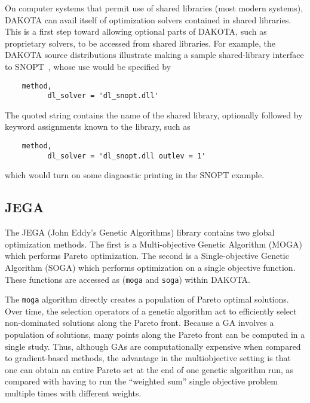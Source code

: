 On computer systems that permit use of shared libraries (most modern systems),
DAKOTA can avail itself of optimization solvers contained in shared libraries.
This is a first step toward allowing optional parts of DAKOTA, such as
proprietary solvers, to be accessed from shared libraries.  For example,
the DAKOTA source distributions illustrate making
a sample shared-library interface to SNOPT~\cite{GilMS05},
whose use would be specified by
\begin{small}
\begin{verbatim}
    method,
          dl_solver = 'dl_snopt.dll'
\end{verbatim}
\end{small}
The quoted string contains the name of the shared library, optionally
followed by keyword assignments known to the library, such as
\begin{small}
\begin{verbatim}
    method,
          dl_solver = 'dl_snopt.dll outlev = 1'
\end{verbatim}
\end{small}
which would turn on some diagnostic printing in the SNOPT example.

\subsection{JEGA}\label{opt:software:jega}

The JEGA (John Eddy's Genetic Algorithms) library contains two global
optimization methods. The first is a Multi-objective Genetic Algorithm
(MOGA) which performs Pareto optimization. The second is a
Single-objective Genetic Algorithm (SOGA) which performs optimization
on a single objective function.  These functions are accessed as
(\texttt{moga} and \texttt{soga}) within DAKOTA.

The \texttt{moga} algorithm directly creates a population of Pareto
optimal solutions.  Over time, the selection operators of a genetic
algorithm act to efficiently select non-dominated solutions along the
Pareto front.  Because a GA involves a population of solutions, many
points along the Pareto front can be computed in a single study. Thus,
although GAs are computationally expensive when compared to
gradient-based methods, the advantage in the multiobjective setting is
that one can obtain an entire Pareto set at the end of one genetic
algorithm run, as compared with having to run the ``weighted sum''
single objective problem multiple times with different weights.

